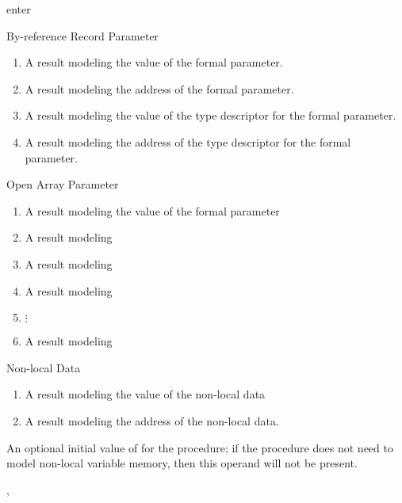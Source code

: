 \begin{instruction}{enter}
\begin{results}
  \item By-reference Record Parameter
    \begin{enumerate}
    \item A result modeling the value of the formal parameter.
    \item A result modeling the address of the formal parameter.
    \item A result modeling the value of the type descriptor for the
      formal parameter.
    \item A result modeling the address of the type descriptor for the
      formal parameter.
    \end{enumerate}

  \item Open Array Parameter
    \begin{enumerate}
    \item A result modeling the value of the formal parameter
    \item A result modeling 
    \item A result modeling 
    \item A result modeling 
    \item $\vdots$
    \item A result modeling 
    \end{enumerate}

  \item Non-local Data
    \begin{enumerate}
    \item A result modeling the value of the non-local data
    \item A result modeling the address of the non-local data.
    \end{enumerate}
  \end{results}

  \begin{operands}
  \item An optional initial value of  for the procedure;
    if the procedure does not need to model non-local variable memory,
    then this operand will not be present.
  \end{operands}

  \begin{seealso}
    , 
  \end{seealso}
\end{instruction}

